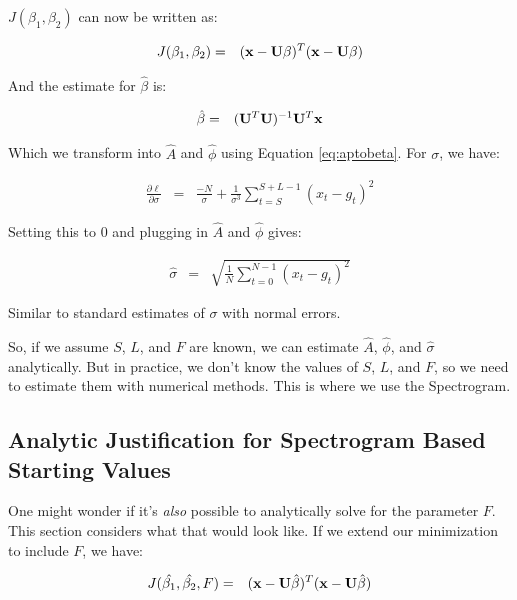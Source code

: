 \documentclass[11pt]{article}
\theoremstyle{plain}
\theoremstyle{definition}
\begin{document}
\noindent $J(\beta_1, \beta_2)$ can now be written as:

\begin{eqnarray}
	J(\beta_1, \beta_2) &=& ({\bf x} - {\bf U} {\bf \beta})^T ({\bf x} - {\bf U} {\bf \beta}) 
\end{eqnarray}

\noindent And the estimate for $\hat{\beta}$ is:

\begin{eqnarray}
\label{eq:betahat}
	\hat{\beta} &=& ({\bf U}^T {\bf U})^{-1} {\bf U}^T {\bf x} 
\end{eqnarray}

\noindent Which we transform into $\hat{A}$ and $\hat{\phi}$ using Equation \ref{eq:aptobeta}. For $\sigma$, we have:

\begin{eqnarray}
	\frac{\partial \ell}{\partial \sigma} &=& \frac{-N}{\sigma} + \frac{1}{\sigma^3} \sum_{t=S}^{S+L-1} (x_t - g_t)^2
\end{eqnarray}

\noindent Setting this to $0$ and plugging in $\hat{A}$ and $\hat{\phi}$ gives:

\begin{eqnarray}
	\hat{\sigma} &=& \sqrt{\frac{1}{N} \sum_{t=0}^{N-1} (x_t - g_t)^2}
\end{eqnarray}

\noindent Similar to standard estimates of $\sigma$ with normal errors. 	

So, if we assume $S$, $L$, and $F$ are known, we can estimate $\hat{A}$, $\hat{\phi}$, and $\hat{\sigma}$ analytically. But in practice, we don't know the values of $S$, $L$, and $F$, so we need to estimate them with numerical methods. This is where we use the Spectrogram. 

\subsection{Analytic Justification for Spectrogram Based Starting Values}
\label{sec:analyticnumerical}
One might wonder if it's {\it also} possible to analytically solve for the parameter $F$. This section considers what that would look like. If we extend our minimization to include $F$, we have:

\begin{eqnarray}
	J(\hat{\beta_1}, \hat{\beta_2}, F) &=& ({\bf x} - {\bf U} \hat{\beta})^T ({\bf x} - {\bf U} \hat{\beta})
\end{eqnarray}
\end{document}
